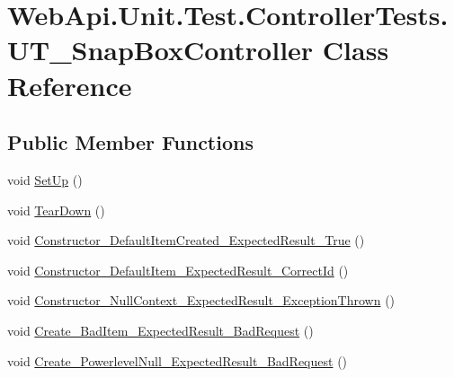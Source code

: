 \hypertarget{class_web_api_1_1_unit_1_1_test_1_1_controller_tests_1_1_u_t___snap_box_controller}{}\section{Web\+Api.\+Unit.\+Test.\+Controller\+Tests.\+U\+T\+\_\+\+Snap\+Box\+Controller Class Reference}
\label{class_web_api_1_1_unit_1_1_test_1_1_controller_tests_1_1_u_t___snap_box_controller}
\subsection*{Public Member Functions}
\begin{DoxyCompactItemize}
\item 
void \mbox{\hyperlink{class_web_api_1_1_unit_1_1_test_1_1_controller_tests_1_1_u_t___snap_box_controller_a622b576dfe0f885dffb768ee0f882bb7}{Set\+Up}} ()
\item 
void \mbox{\hyperlink{class_web_api_1_1_unit_1_1_test_1_1_controller_tests_1_1_u_t___snap_box_controller_a31959096f70a4bffc3bb17cfda037715}{Tear\+Down}} ()
\item 
void \mbox{\hyperlink{class_web_api_1_1_unit_1_1_test_1_1_controller_tests_1_1_u_t___snap_box_controller_a242d73da99b18cce0f02a540348e8d74}{Constructor\+\_\+\+Default\+Item\+Created\+\_\+\+Expected\+Result\+\_\+\+True}} ()
\item 
void \mbox{\hyperlink{class_web_api_1_1_unit_1_1_test_1_1_controller_tests_1_1_u_t___snap_box_controller_a7472356d4d0de93fff6ea0e5d11edb96}{Constructor\+\_\+\+Default\+Item\+\_\+\+Expected\+Result\+\_\+\+Correct\+Id}} ()
\item 
void \mbox{\hyperlink{class_web_api_1_1_unit_1_1_test_1_1_controller_tests_1_1_u_t___snap_box_controller_a212bfbf19c0eec2f633cfd1182913730}{Constructor\+\_\+\+Null\+Context\+\_\+\+Expected\+Result\+\_\+\+Exception\+Thrown}} ()
\item 
void \mbox{\hyperlink{class_web_api_1_1_unit_1_1_test_1_1_controller_tests_1_1_u_t___snap_box_controller_a10103848d39e753f690c15dd5b89142f}{Create\+\_\+\+Bad\+Item\+\_\+\+Expected\+Result\+\_\+\+Bad\+Request}} ()
\item 
void \mbox{\hyperlink{class_web_api_1_1_unit_1_1_test_1_1_controller_tests_1_1_u_t___snap_box_controller_aa769ea4932408893f0f33bba22933aee}{Create\+\_\+\+Powerlevel\+Null\+\_\+\+Expected\+Result\+\_\+\+Bad\+Request}} ()

\end{DoxyCompactItemize}
